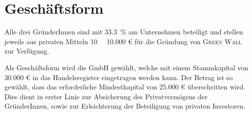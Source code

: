     \section{Geschäftsform}

    Alle drei GründerInnen sind mit \qty{33.3}{\percent} am Unternehmen beteiligt und stellen jeweils aus privaten Mitteln \qty{10}{\kilo\EUR} 10.000 € für die Gründung von \textsc{Green Wall} zur Verfügung.

    Als Geschäftsform wird die GmbH gewählt, welche mit einem Stammkapital von 30.000 € in das Handelsregister eingetragen werden kann. 
    Der Betrag ist so gewählt, dass das erforderliche Mindestkapital von 25.000 € überschritten wird. 
    Dies dient in erster Linie zur Absicherung des Privatvermögens der GründerInnen, sowie zur Erleichterung der Beteiligung von privaten Investoren. 
    
